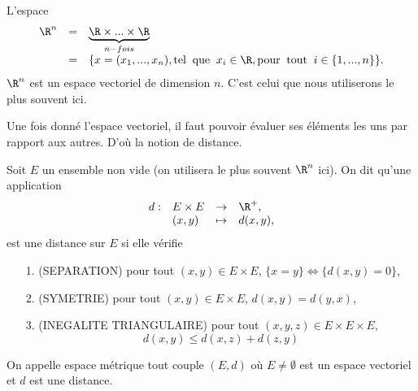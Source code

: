 \documentclass[class=report,crop=false]{standalone}
\begin{document}
\begin{exemple}
 \textcolor[rgb]{0.00,0.59,0.00}
{$ $\\  
L'espace 
\begin{equation*}
\begin{array}{rcl}
\R^n & = &\displaystyle \underbrace{\R \times ...\times \R}_{n-fois}\\
   & = & \lbrace x=(x_1,...,x_n),\mathrm{tel\;\; que}\;\; x_i\in \R,\mathrm{pour\;\; tout}\;\; i \in \lbrace 1,...,n \rbrace \rbrace.
\end{array}
\end{equation*}
$\R^n$ est un espace vectoriel de dimension $n$. C'est celui que nous utiliserons le plus souvent ici.
}
\end{exemple}

\noindent Une fois donné l'espace vectoriel, il faut pouvoir évaluer ses éléments
les uns par rapport aux autres. D'où la notion de distance.

\begin{definition}[DISTANCE]
\textcolor[rgb]{0.73,0.00,0.00}{
 \noindent Soit $E$ un ensemble non vide (on utilisera le plus souvent $\R^n$ ici). On dit qu'une application 
 \begin{equation*}
 \begin{array}{llll}
d: & E \times E & \rightarrow & \R^+,\\
 & (x,y) & \mapsto & d(x,y),
\end{array}
 \end{equation*}
est une distance sur $E$ si elle vérifie 
\begin{itemize}
\item[1.](SEPARATION) pour tout $(x,y) \in E \times E$, $\lbrace x=y  \rbrace \Longleftrightarrow \lbrace d(x,y)=0 \rbrace$,
\item[2.](SYMETRIE) pour tout $(x,y) \in E \times E$, $d(x,y)=d(y,x)$,
\item[3.](INEGALITE TRIANGULAIRE) pour tout $(x,y,z) \in E \times E \times E$, 
\begin{equation*}
d(x,y) \leq d(x,z)+ d(z,y)
\end{equation*}
\end{itemize}
 }
 \end{definition}
 

\begin{definition}
\textcolor[rgb]{0.73,0.00,0.00}{
\noindent  On appelle espace métrique tout couple $(E,d)$ où $E \neq \emptyset $ 
 est un espace vectoriel et $d$ est une distance.
 }
 \end{definition}
 
\end{document}
